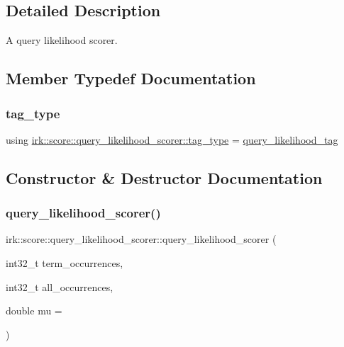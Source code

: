 \subsection{Detailed Description}
A query likelihood scorer. 

\subsection{Member Typedef Documentation}
\mbox{\label{structirk_1_1score_1_1query__likelihood__scorer_a4a7795fbd9f018d25bdc59c5ae001e2a}} 
\subsubsection{\texorpdfstring{tag\+\_\+type}{tag\_type}}
{\footnotesize\ttfamily using \mbox{\hyperlink{structirk_1_1score_1_1query__likelihood__scorer_a4a7795fbd9f018d25bdc59c5ae001e2a}{irk\+::score\+::query\+\_\+likelihood\+\_\+scorer\+::tag\+\_\+type}} =  \mbox{\hyperlink{structirk_1_1score_1_1query__likelihood__tag}{query\+\_\+likelihood\+\_\+tag}}}



\subsection{Constructor \& Destructor Documentation}
\mbox{\label{structirk_1_1score_1_1query__likelihood__scorer_ae1e3acdf44043bb428c4b281389f18c7}} 
\subsubsection{\texorpdfstring{query\+\_\+likelihood\+\_\+scorer()}{query\_likelihood\_scorer()}}
{\footnotesize\ttfamily irk\+::score\+::query\+\_\+likelihood\+\_\+scorer\+::query\+\_\+likelihood\+\_\+scorer (\begin{DoxyParamCaption}\item[{int32\+\_\+t}]{term\+\_\+occurrences,  }\item[{int32\+\_\+t}]{all\+\_\+occurrences,  }\item[{double}]{mu = {} }\end{DoxyParamCaption})\hspace{0.3cm}{\ttfamily [inline]}}



